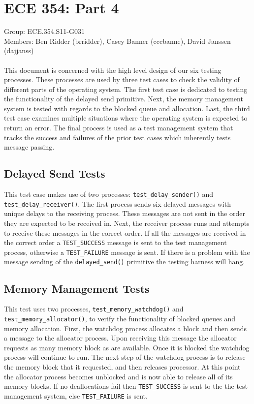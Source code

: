 \documentclass[oneside]{article}
\begin{document}
\lstset{language=C, 
        frame=single, 
        breaklines=true,
        basicstyle=\small\ttfamily,
        columns=fullflexible}

\section*{ECE 354: Part 4}
Group: ECE.354.S11-G031 \\
Members: Ben Ridder (brridder), Casey Banner (cccbanne), 
David Janssen (dajjanss) \\ \\
This document is concerned with the high level design of our six testing 
processes. These processes are used by three test cases to check the 
validity of different parts of the operating system. The first test case is 
dedicated to testing the functionality of the delayed send primitive. Next, the 
memory management system is tested with regards to the blocked queue and 
allocation. Last, the third test case examines multiple situations where the 
operating system is expected to return an error. The final process is used as a 
test management system that tracks the success and failures of the prior test 
cases which inherently tests message passing. 

\subsection*{Delayed Send Tests}
This test case makes use of two processes: \texttt{test\_delay\_sender()} and 
\texttt{test\_delay\_receiver()}. The first process sends six delayed messages 
with unique delays to the receiving process. These messages are not sent in the 
order they are expected to be received in. Next, the receiver process runs and 
attempts to receive these messages in the correct order. If all the messages 
are received in the correct order a \texttt{TEST\_SUCCESS} message is sent to 
the test management process, otherwise a \texttt{TEST\_FAILURE} message is sent.
 If there is a problem with the message sending of the \texttt{delayed\_send()} 
primitive the testing harness will hang.

\subsection*{Memory Management Tests}
This test uses two processes, \texttt{test\_memory\_watchdog()} and
\texttt{test\_memory\_allocator()}, to verify the functionality of
blocked queues and memory allocation. First, the watchdog process
allocates a block and then sends a message to the allocator
process. Upon receiving this message the allocator requests as many
memory block as are available. Once it is blocked the watchdog process
will continue to run. The next step of the watchdog process is to
release the memory block that it requested, and then releases
processor. At this point the allocator process becomes unblocked and
is now able to release all of its memory blocks. If no deallocations
fail then \texttt{TEST\_SUCCESS} is sent to the the test management
system, else \texttt{TEST\_FAILURE} is sent.
\end{document}
